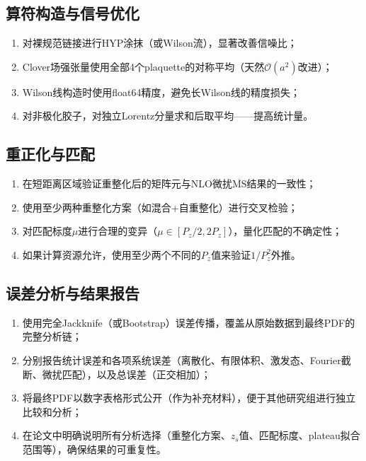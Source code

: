 \documentclass[11pt,a4paper]{ctexart}
\newcommand{\order}[1]{\mathcal{O}(#1)}
\begin{document}
\subsection{算符构造与信号优化}

\begin{enumerate}
  \item 对裸规范链接进行HYP涂抹（或Wilson流），显著改善信噪比；
  \item Clover场强张量使用全部4个plaquette的对称平均（天然$\order{a^2}$改进）；
  \item Wilson线构造时使用float64精度，避免长Wilson线的精度损失；
  \item 对非极化胶子，对独立Lorentz分量求和后取平均——提高统计量。
\end{enumerate}

\subsection{重正化与匹配}

\begin{enumerate}
  \item 在短距离区域验证重整化后的矩阵元与NLO微扰$\overline{\text{MS}}$结果的一致性；
  \item 使用至少两种重整化方案（如混合+自重整化）进行交叉检验；
  \item 对匹配标度$\mu$进行合理的变异（$\mu \in [P_z/2, 2P_z]$），量化匹配的不确定性；
  \item 如果计算资源允许，使用至少两个不同的$P_z$值来验证$1/P_z^2$外推。
\end{enumerate}

\subsection{误差分析与结果报告}

\begin{enumerate}
  \item 使用完全Jackknife（或Bootstrap）误差传播，覆盖从原始数据到最终PDF的完整分析链；
  \item 分别报告统计误差和各项系统误差（离散化、有限体积、激发态、Fourier截断、微扰匹配），以及总误差（正交相加）；
  \item 将最终PDF以数字表格形式公开（作为补充材料），便于其他研究组进行独立比较和分析；
  \item 在论文中明确说明所有分析选择（重整化方案、$z_s$值、匹配标度、plateau拟合范围等），确保结果的可重复性。
\end{enumerate}
\end{document}
